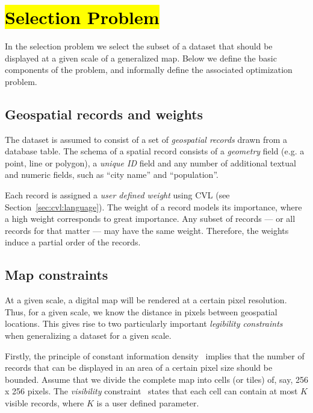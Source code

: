 \section{\hl{Selection Problem}}
\label{sec:background}

In the selection problem we select the subset of a dataset that should be displayed at a given scale of a generalized map. Below we define the basic components of the problem, and informally define the associated optimization problem.

\subsection{Geospatial records and weights}
\label{sec:records}

The dataset is assumed to consist of a set of \emph{geospatial records} drawn from a database table. The schema of a spatial record consists of a \emph{geometry} field (e.g. a point, line or polygon), a \emph{unique ID} field and any number of additional textual and numeric fields, such as ``city name'' and ``population''.

Each record is assigned a \emph{user defined weight} using CVL (see Section~\ref{sec:cvl:language}). The weight of a record models its importance, where a high weight corresponds to great importance. Any subset of records --- or all records for that matter --- may have the same weight. Therefore, the weights induce a partial order of the records.

\subsection{Map constraints}
\label{sec:constraints}

At a given scale, a digital map will be rendered at a certain pixel resolution. Thus, for a given scale, we know the distance in pixels between geospatial locations. This gives rise to two particularly important \emph{legibility constraints}~\cite{harrie2007modelling} when generalizing a dataset for a given scale.

Firstly, the principle of constant information density~\cite{topfer1966principles} implies that the number of records that can be displayed in an area of a certain pixel size should be bounded. Assume that we divide the complete map into cells (or tiles) of, say, 256 x 256 pixels. The \emph{visibility} constraint~\cite{sarma2012fusiontables} states that each cell can contain at most $K$ visible records, where $K$ is a user defined parameter.

